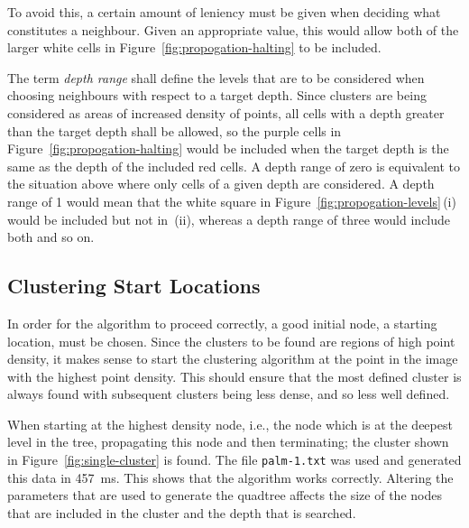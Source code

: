 To avoid this, a certain amount of leniency must be given when deciding what
constitutes a neighbour. Given an appropriate value, this would allow both of
the larger white cells in Figure~\ref{fig:propogation-halting} to be included.

The term \emph{depth range} shall define the levels that are to be considered
when choosing neighbours with respect to a target depth. Since clusters are
being considered as areas of increased density of points, all cells with a
depth greater than the target depth shall be allowed, so the purple cells in
Figure~\ref{fig:propogation-halting} would be included when the target depth is
the same as the depth of the included red cells. A depth range of zero is
equivalent to the situation above where only cells of a given depth are
considered. A depth range of 1 would mean that the white square in
Figure~\ref{fig:propogation-levels}\,(i) would be included but not in~(ii),
whereas a depth range of three would include both and so on.

\subsection{Clustering Start Locations}
\label{sub:clustering_start_locations}

In order for the algorithm to proceed correctly, a good initial node, a
starting location, must be chosen. Since the clusters to be found are regions
of high point density, it makes sense to start the clustering algorithm at the
point in the image with the highest point density. This should ensure that the
most defined cluster is always found with subsequent clusters being less dense,
and so less well defined.

When starting at the highest density node, i.e., the node which is at the
deepest level in the tree, propagating this node and then terminating; the
cluster shown in Figure~\ref{fig:single-cluster} is found. The file
\texttt{palm-1.txt} was used and generated this data in
\SI{457}{\milli\second}. This shows that the algorithm works correctly.
Altering the parameters that are used to generate the quadtree affects the size
of the nodes that are included in the cluster and the depth that is searched.

